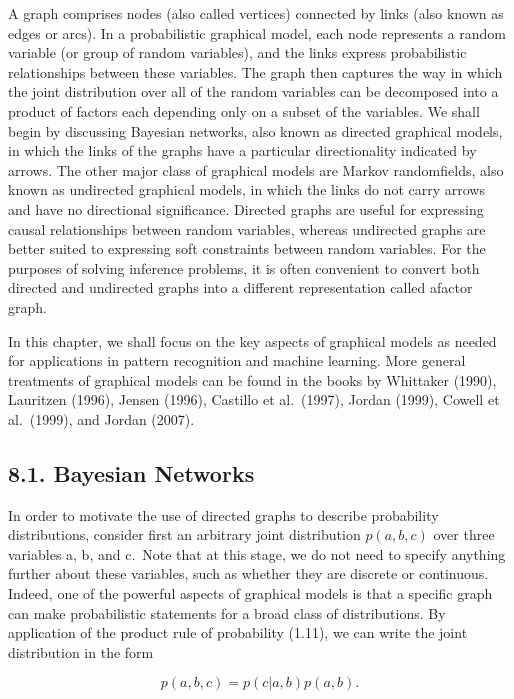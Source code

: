 \documentclass[
  10
]{article}
\begin{document}
A graph comprises nodes (also called vertices) connected by links (also
known as edges or arcs). In a probabilistic graphical model, each node
represents a random variable (or group of random variables), and the
links express probabilistic relationships between these variables. The
graph then captures the way in which the joint distribution over all of
the random variables can be decomposed into a product of factors each
depending only on a subset of the variables. We shall begin by
discussing Bayesian networks, also known as directed graphical models,
in which the links of the graphs have a particular directionality
indicated by arrows. The other major class of graphical models are
Markov randomfields, also known as undirected graphical models, in which
the links do not carry arrows and have no directional significance.
Directed graphs are useful for expressing causal relationships between
random variables, whereas undirected graphs are better suited to
expressing soft constraints between random variables. For the purposes
of solving inference problems, it is often convenient to convert both
directed and undirected graphs into a different representation called
afactor graph.

In this chapter, we shall focus on the key aspects of graphical models
as needed for applications in pattern recognition and machine learning.
More general treatments of graphical models can be found in the books by
Whittaker (1990), Lauritzen (1996), Jensen (1996), Castillo et
al.~(1997), Jordan (1999), Cowell et al.~(1999), and Jordan (2007).

\subsection{8.1. Bayesian Networks}\label{bayesian-networks}

In order to motivate the use of directed graphs to describe probability
distributions, consider first an arbitrary joint distribution
\(\textstyle p ( a , b , c )\) over three variables a, b, and c.~Note
that at this stage, we do not need to specify anything further about
these variables, such as whether they are discrete or continuous.
Indeed, one of the powerful aspects of graphical models is that a
specific graph can make probabilistic statements for a broad class of
distributions. By application of the product rule of probability (1.11),
we can write the joint distribution in the form

\[
p (a, b, c) = p (c | a, b) p (a, b).\tag{8.1}
\]
\end{document}

